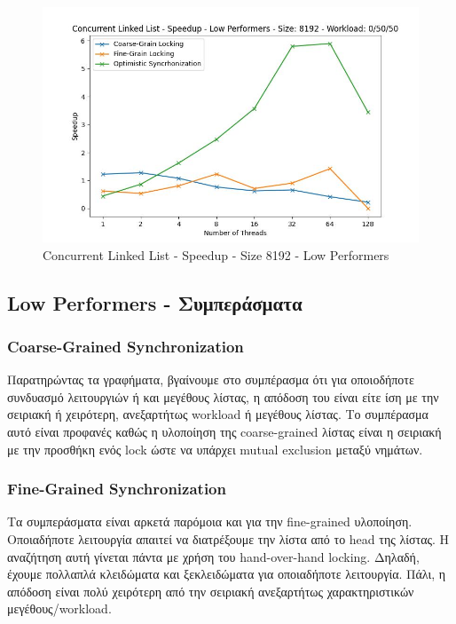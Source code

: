 \documentclass[../final_report.tex]{subfiles}
\begin{document}
\begin{figure}[H]
        \includegraphics[scale=0.4]{outFiles/plots/concurrent_data_structs_low_speedup_8192_0_50_50.jpg}
    \caption{Concurrent Linked List - Speedup - Size 8192 - Low Performers}
    \label{fig:Concurrent Linked List - Speedup - Size 8192 - Low Performers}
\end{figure}

\subsection*{Low Performers - Συμπεράσματα}

\subsubsection*{Coarse-Grained Synchronization}
Παρατηρώντας τα γραφήματα, βγαίνουμε στο συμπέρασμα ότι για οποιοδήποτε συνδυασμό λειτουργιών ή και
μεγέθους λίστας, η απόδοση του είναι είτε ίση με την σειριακή ή χειρότερη, ανεξαρτήτως workload ή μεγέθους λίστας. Το συμπέρασμα αυτό είναι 
προφανές καθώς η υλοποίηση της coarse-grained λίστας είναι η σειριακή με την προσθήκη ενός lock ώστε
να υπάρχει mutual exclusion μεταξύ νημάτων. 

\subsubsection*{Fine-Grained Synchronization}
Τα συμπεράσματα είναι αρκετά παρόμοια και για την fine-grained υλοποίηση. Οποιαδήποτε λειτουργία απαιτεί να διατρέξουμε
την λίστα από το head της λίστας. Η αναζήτηση αυτή γίνεται πάντα με χρήση του hand-over-hand locking. Δηλαδή, έχουμε πολλαπλά
κλειδώματα και ξεκλειδώματα για οποιαδήποτε λειτουργία. Πάλι, η απόδοση είναι πολύ χειρότερη από την σειριακή ανεξαρτήτως
χαρακτηριστικών μεγέθους/workload.
\end{document}

